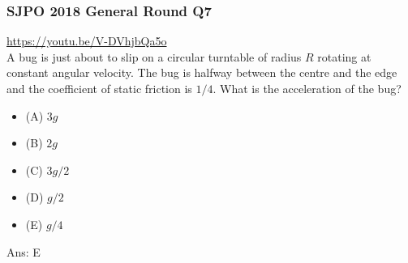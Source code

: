 \documentclass{article}
\begin{document}
\subsubsection{SJPO 2018 General Round Q7}
\url{https://youtu.be/V-DVhjbQa5o}\\
A bug is just about to slip on a circular turntable of radius $R$ rotating at constant angular velocity. The bug is halfway between the centre and the edge and the coefficient of static friction is $1 / 4$. What is the acceleration of the bug?
\begin{itemize}
\item[] (A) $3 g$
\item[] (B) $2 g$
\item[] (C) $3 g / 2$
\item[] (D) $g / 2$
\item[] (E) $g / 4$
\end{itemize}
Ans: \ifpaper E \fi
\end{document}
